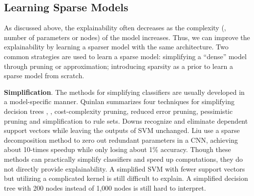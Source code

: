 




\subsection{Learning Sparse Models}

As discussed above, the explainability often decreases as the complexity (\ie, number of parameters or nodes) of the model increases. Thus, we can improve the explainability by learning a sparser model with the same architecture. Two common strategies are used to learn a sparse model: simplifying a ``dense'' model through pruning or approximation; introducing sparsity as a prior to learn a sparse model from scratch. 


\textbf{Simplification}. The methods for simplifying classifiers are usually developed in a model-specific manner. Quinlan \cite{quinlan1987simplifying} summarizes four techniques for simplifying decision trees , \ie, cost-complexity pruning, reduced error pruning, pessimistic pruning and simplification to rule sets. Downs \etal \cite{downs2001simplifysvm} recognize and eliminate dependent support vectors while leaving the outputs of SVM unchanged. Liu \etal \cite{liu2015sparsecnn} use a sparse decomposition method to zero out redundant parameters in a CNN, achieving about 10-times speedup while only losing about 1\% accuracy. Though these methods can practically simplify classifiers and speed up computations, they do not directly provide explainability. A simplified SVM with fewer support vectors but utilizing a complicated kernel is still difficult to explain. A simplified decision tree with 200 nodes instead of 1,000 nodes is still hard to interpret.

